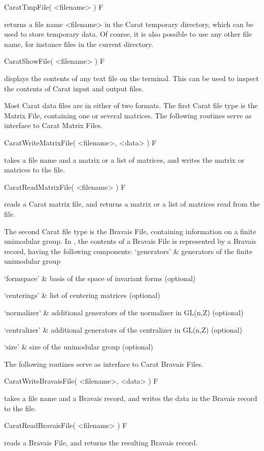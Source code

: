 \>CaratTmpFile( <filename> ) F

returns a file name <filename> in the Carat temporary directory, which
can be used to store temporary data. Of course, it is also possible
to use any other file name, for instance files in the current directory.

\>CaratShowFile( <filename> ) F

displays the contents of any text file on the terminal. This can be
used to inspect the contents of Carat input and output files.

Most Carat data files are in either of two formats. The first Carat
file type is the Matrix File, containing one or several matrices.
The following routines serve as interface to Carat Matrix Files.

\>CaratWriteMatrixFile( <filename>, <data> ) F

takes a file name and a matrix or a list of matrices, and writes the
matrix or matrices to the file.

\>CaratReadMatrixFile( <filename> ) F

reads a Carat matrix file, and returns a matrix or a list of matrices
read from the file.

The second Carat file type is the Bravais File, containing information
on a finite unimodular group. In { \GAP}, the contents of a Bravais File 
is represented by a Bravais record, having the following components:
\beginitems
`generators'   & generators of the finite unimodular group

`formspace'    & basis of the space of invariant forms (optional)

`centerings'   & list of centering matrices (optional)

`normalizer'   & additional generators of the normalizer in GL(n,Z) (optional)

`centralizer'  & additional generators of the centralizer in GL(n,Z) (optional)

`size'         & size of the unimodular group (optional)
\enditems

The following routines serve as interface to Carat Bravais Files.

\>CaratWriteBravaisFile( <filename>, <data> ) F

takes a file name and a Bravais record, and writes the data in the
Bravais record to the file.

\>CaratReadBravaisFile( <filename> ) F

reads a Bravais File, and returns the resulting Bravais record.

